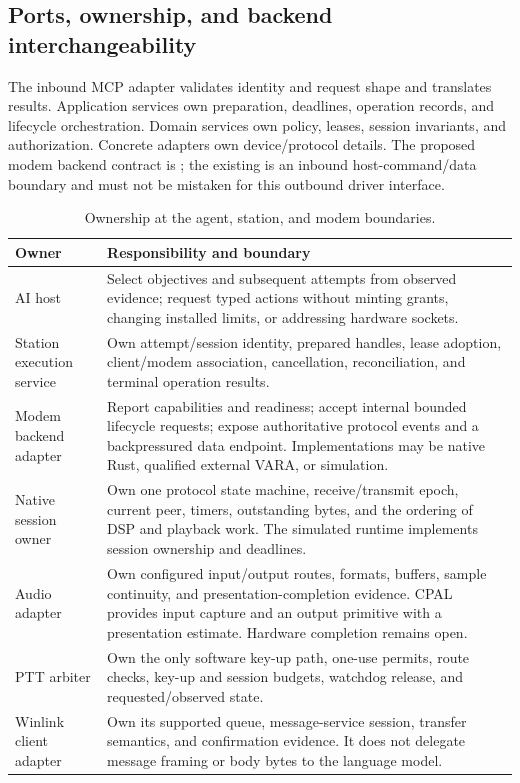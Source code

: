 \subsection{Ports, ownership, and backend interchangeability}
The inbound MCP adapter validates identity and request shape and translates
results. Application services own preparation, deadlines, operation records,
and lifecycle orchestration. Domain services own policy, leases, session
invariants, and authorization. Concrete adapters own device/protocol details.
The proposed modem backend contract is ; the existing
 is an inbound host-command/data boundary and must not be
mistaken for this outbound driver interface.

\begin{longtable}{@{}p{}p{}@{}}
\caption{Ownership at the agent, station, and modem boundaries.}\label{tab:modem-ownership}\\
\toprule
\textbf{Owner} & \textbf{Responsibility and boundary}\\
\midrule
\endhead
AI host & Select objectives and subsequent attempts from observed evidence;
request typed actions without minting grants, changing installed limits, or
addressing hardware sockets.\\
Station execution service & Own attempt/session identity, prepared handles,
lease adoption, client/modem association, cancellation, reconciliation, and
terminal operation results.\\
Modem backend adapter & Report capabilities and readiness; accept internal
bounded lifecycle requests; expose authoritative protocol events and a
backpressured data endpoint. Implementations may be native Rust, qualified
external VARA, or simulation.\\
Native session owner & Own one protocol state machine, receive/transmit epoch,
current peer, timers, outstanding bytes, and the ordering of DSP and playback
work. The simulated runtime implements session ownership and deadlines.\\
Audio adapter & Own configured input/output routes, formats, buffers, sample
continuity, and presentation-completion evidence. CPAL provides input capture and an output
primitive with a presentation estimate. Hardware completion remains open.\\
PTT arbiter & Own the only software key-up path, one-use permits, route checks,
key-up and session budgets, watchdog release, and requested/observed state.\\
Winlink client adapter & Own its supported queue, message-service session,
transfer semantics, and confirmation evidence. It does not delegate message
framing or body bytes to the language model.\\
\bottomrule
\end{longtable}

